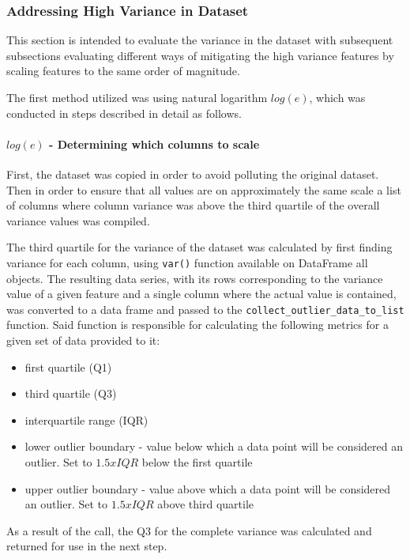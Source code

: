 \subsubsection{Addressing High Variance in Dataset}\label{sec:impl-data-analysis:dealing-with-variance}
This section is intended to evaluate the variance in the dataset with subsequent subsections evaluating different ways of mitigating the high variance features by scaling features to the same order of magnitude.

The first method utilized was using natural logarithm $log(e)$, which was conducted in steps described in detail as follows.
\paragraph{$log(e)$ - Determining which columns to scale}
First, the dataset was copied in order to avoid polluting the original dataset. Then in order to ensure that all values are on approximately the same scale a list of columns where column variance was above the third quartile of the overall variance values was compiled. 

The third quartile for the variance of the dataset was calculated by first finding variance for each column, using \texttt{var()} function available on DataFrame all objects. The resulting data series, with its rows corresponding to the variance value of a given feature and a single column where the actual value is contained, was converted to a data frame and passed to the \texttt{collect\_outlier\_data\_to\_list} function. Said function is responsible for calculating the following metrics for a given set of data provided to it:
\begin{itemize}
    \item first quartile (Q1)
    \item third quartile (Q3)
    \item interquartile range (IQR)
    \item lower outlier boundary - value below which a data point will be considered an outlier. Set to $1.5x IQR$ below the first quartile
    \item upper outlier boundary - value above which a data point will be considered an outlier. Set to $1.5x IQR$ above third quartile
\end{itemize}

As a result of the call, the Q3 for the complete variance was calculated and returned for use in the next step.

